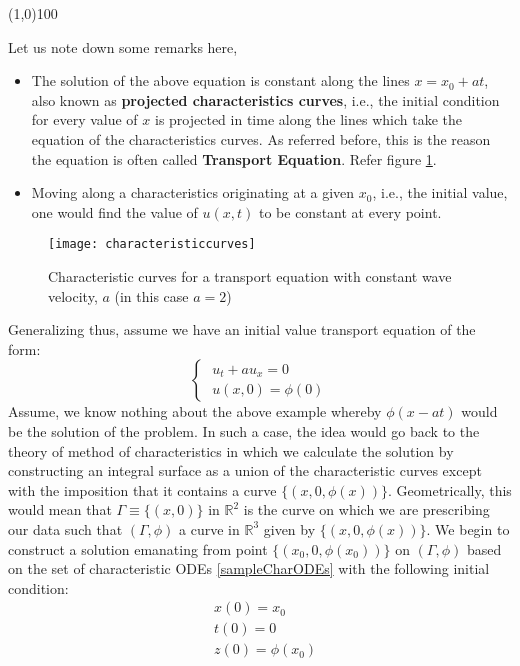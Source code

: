\documentclass[11pt, a4paper]{report}
\begin{document}
\begin{center}
    \line(1,0){100}
\end{center}


Let us note down some remarks here,
\begin{itemize}
    \item The solution of the above equation is constant along the lines $x = x_0 + at$, also known as {\bfseries 
    projected characteristics curves}, i.e., the initial condition for every value of $x$ is projected in time along 
    the lines which take the equation of the characteristics curves. As referred before, this is the reason the
    equation is often called {\bfseries Transport Equation}. Refer figure \ref{fig:characteristiccurves}.
    
    \item  Moving along a characteristics originating at a given $x_0$, i.e., the initial value, one would find the 
    value of $u(x,t)$ to be constant at every point. 
\end{itemize}

\begin{figure}[h]
    \centering
    \texttt{[image: characteristiccurves]}
    \caption{Characteristic curves for a transport equation with constant wave velocity, $a$ (in this case $a=2$)}
    \label{fig:characteristiccurves}
\end{figure}

Generalizing thus, assume we have an initial value transport equation of the form:
\begin{equation}
    \begin{cases}
        \; u_t + a{u_x} = 0\\[-0.5em] %
        \; u(x, 0) = \phi(0)
    \end{cases}
\end{equation}
Assume, we know nothing about the above example whereby $\phi(x-at)$ would be the solution of the problem. In such a 
case, the idea would go back to the theory of method of characteristics in which we calculate the solution by constructing
an integral surface as a union of the characteristic curves except with the imposition that it contains a curve $\{(x, 0, 
\phi(x))\}$. Geometrically, this would mean that $\Gamma\equiv\{(x, 0)\}$ in $\mathbb{R}^{2}$ is the curve on which we are
prescribing our data such that $(\Gamma, \phi)$  a curve in $\mathbb{R}^{3}$ given by $\{(x, 0, \phi(x))\}$. We begin to
construct a solution emanating from point $\{(x_0, 0, \phi(x_0))\}$ on $(\Gamma, \phi)$ based on the set of characteristic 
ODEs \eqref{sampleCharODEs} with the following initial condition:
\begin{equation*}
    \begin{aligned} %
        & x(0) = x_0\\[-0.5em] %
        & t(0) = 0\\[-0.5em]
        & z(0) = \phi(x_0)
    \end{aligned}
\end{equation*}
\end{document}
